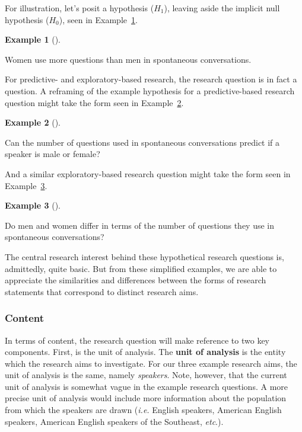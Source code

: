 \documentclass[
  letterpaper,
]{latex/krantz}
\theoremstyle{definition}
\newtheorem{example}{Example}[chapter]
\theoremstyle{remark}
\begin{document}
For illustration, let's posit a hypothesis (\(H_1\)), leaving aside the
implicit null hypothesis (\(H_0\)), seen in
Example~\ref{exm-fr-form-infer}.

\begin{example}[]\protect\hypertarget{exm-fr-form-infer}{}\label{exm-fr-form-infer}

Women use more questions than men in spontaneous conversations.

\end{example}

For predictive- and exploratory-based research, the research question is
in fact a question. A reframing of the example hypothesis for a
predictive-based research question might take the form seen in
Example~\ref{exm-fr-form-pred}.

\begin{example}[]\protect\hypertarget{exm-fr-form-pred}{}\label{exm-fr-form-pred}

Can the number of questions used in spontaneous conversations predict if
a speaker is male or female?

\end{example}

And a similar exploratory-based research question might take the form
seen in Example~\ref{exm-fr-form-exp}.

\begin{example}[]\protect\hypertarget{exm-fr-form-exp}{}\label{exm-fr-form-exp}

Do men and women differ in terms of the number of questions they use in
spontaneous conversations?

\end{example}

The central research interest behind these hypothetical research
questions is, admittedly, quite basic. But from these simplified
examples, we are able to appreciate the similarities and differences
between the forms of research statements that correspond to distinct
research aims.

\subsubsection{Content}\label{sec-fr-question-content}

In terms of content, the research question will make reference to two
key components. First, is the unit of analysis. The \textbf{unit of
analysis} is the entity which the research aims to investigate. For our
three example research aims, the unit of analysis is the same, namely
\emph{speakers}. Note, however, that the current unit of analysis is
somewhat vague in the example research questions. A more precise unit of
analysis would include more information about the population from which
the speakers are drawn (\emph{i.e.} English speakers, American English
speakers, American English speakers of the Southeast, \emph{etc}.).
\end{document}

